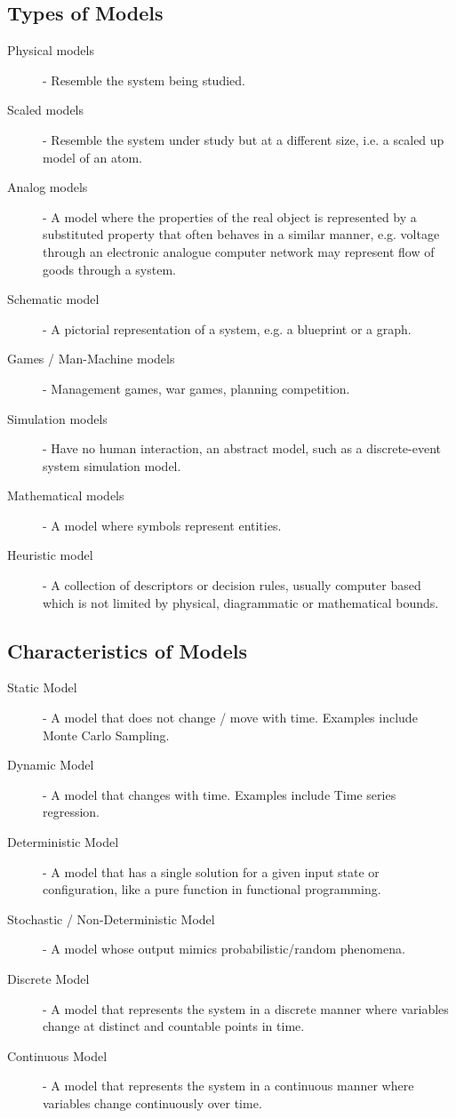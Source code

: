 \documentclass[12pt letter]{report}
\begin{document}



\subsection{Types of Models}
\begin{description}
  \item[Physical models]  - Resemble the system being studied.
  \item[Scaled models] - Resemble the system under study but at a different size, i.e. a scaled up model of an atom.
  \item[Analog models] - A model where the properties of the real object is represented by a substituted property that
        often behaves in a similar manner, e.g. voltage through an electronic analogue computer network may represent flow of
        goods through a system.
  \item[Schematic model] - A pictorial representation of a system, e.g. a blueprint or a graph.
  \item[Games / Man-Machine models] - Management games, war games, planning competition.
  \item[Simulation models] - Have no human interaction, an abstract model, such as a discrete-event system simulation
        model.
  \item[Mathematical models] - A model where symbols represent entities.
  \item[Heuristic model] - A collection of descriptors or decision rules, usually computer based which is not
        limited by physical, diagrammatic or mathematical bounds.
\end{description}

\subsection{Characteristics of Models}

\begin{description}
  \item[Static Model] - A model that does not change / move with time. Examples include Monte Carlo Sampling.
  \item[Dynamic Model] - A model that changes with time. Examples include Time series regression.
  \item[Deterministic Model] - A model that has a single solution for a given input state or configuration, like a pure
        function in functional programming.
  \item[Stochastic / Non-Deterministic Model] - A model whose output mimics probabilistic/random phenomena.
  \item[Discrete Model] - A model that represents the system in a discrete manner where variables change at distinct and
        countable points in time.
  \item[Continuous Model] - A model that represents the system in a continuous manner where variables change continuously
        over time.
\end{description}
\end{document}
